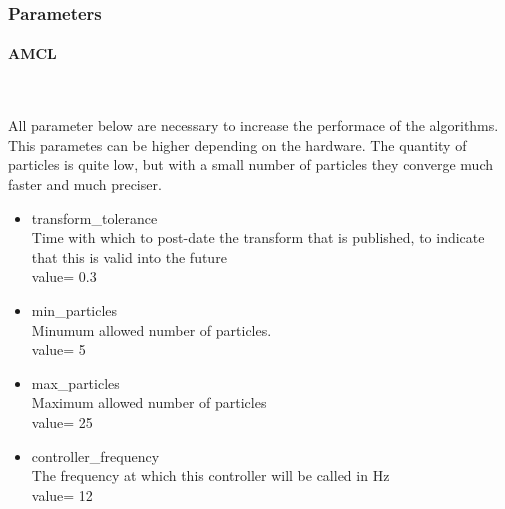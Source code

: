 \documentclass[10pt,journal,compsoc]{IEEEtran}
\newcommand{\subsubsubsection}[1]{\paragraph{#1}\mbox{}\\}
\begin{document}
\subsubsection{Parameters}

\subsubsubsection{AMCL}\par
    All parameter below are necessary to increase the performace of the algorithms. This parametes can be higher depending on
    the hardware.
    The quantity of particles is quite low, but with a small number of particles they converge much faster and much
    preciser.
\begin{itemize}
  \item transform\_tolerance\\ 
        Time with which to post-date the transform that is published, to indicate that this is valid into the future \\
        value= 0.3

   \item min\_particles\\
        Minumum allowed number of particles.\\
        value= 5

   \item max\_particles \\
        Maximum allowed number of particles\\
        value= 25

    \item controller\_frequency\\
      The frequency at which this controller will be called in Hz\\
      value= 12
\end{itemize}
\end{document}
